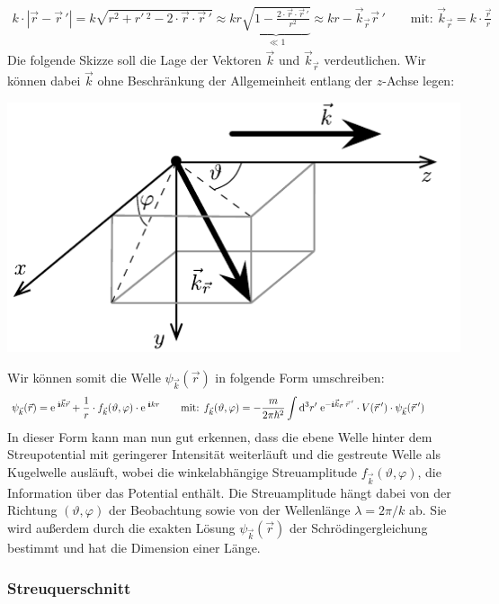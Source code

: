 \begin{eqnarray*}
	k \cdot |\vec{r}-\vec{r}\,'| = k \sqrt{r^2+r'\,^2-2\cdot\vec{r}\cdot\vec{r}\,'} \approx  k r \underbrace{\sqrt{1- \frac{2\cdot\vec{r}\cdot\vec{r}\,'}{r^2}}}_{\ll 1} \approx k r -\vec{k}_{\vec{r}}\vec{r}\,' \qquad \text{mit: } \vec k _{\vec r} = k \cdot \frac{\vec r}r
\end{eqnarray*}
Die folgende Skizze soll die Lage der Vektoren $\vec{k}$ und $\vec{k}_{\vec{r}}$ verdeutlichen. Wir können dabei $\vec{k}$ ohne Beschränkung der Allgemeinheit entlang der $z$-Achse legen: 
\begin{center}\includegraphics[scale=1]{Figs/kkr}\end{center}

Wir können somit die Welle $\psi_{\vec{k}}(\vec{r})$ in folgende Form umschreiben: 
\begin{eqnarray}
	\psi_{\vec{k}}(\vec{r}) = \e^{\;\I\vec{k}\vec{r}} + \frac{1}{r}\cdot f_{\vec{k}}(\vartheta,\varphi)\cdot\e^{\;\I kr} &\quad& \text{mit: } f_{\vec{k}}(\vartheta,\varphi) = -\frac{m}{2\pi\hbar^2} \int\mathrm{d}^3r'\;\e^{-\I\vec{k}_{\vec{r}}\;\vec{r}\,'}\cdot V(\vec{r}\,')\cdot \psi_{\vec{k}}(\vec{r}\,')\qquad\quad \label{streuzustand}
\end{eqnarray}
In dieser Form kann man nun gut erkennen, dass die ebene Welle hinter dem Streupotential mit geringerer Intensität weiterläuft und die gestreute Welle als Kugelwelle ausläuft, wobei die winkelabhängige Streuamplitude $f_{\vec{k}}(\vartheta,\varphi)$, die Information über das Potential enthält. Die Streuamplitude hängt dabei von der Richtung $(\vartheta,\varphi)$ der Beobachtung sowie von der Wellenlänge $\lambda=2\pi/k$ ab. Sie wird außerdem durch die exakten Lösung $\psi_{\vec k}(\vec r)$ der Schrödingergleichung bestimmt und hat die Dimension einer Länge. 


\subsubsection{Streuquerschnitt}

